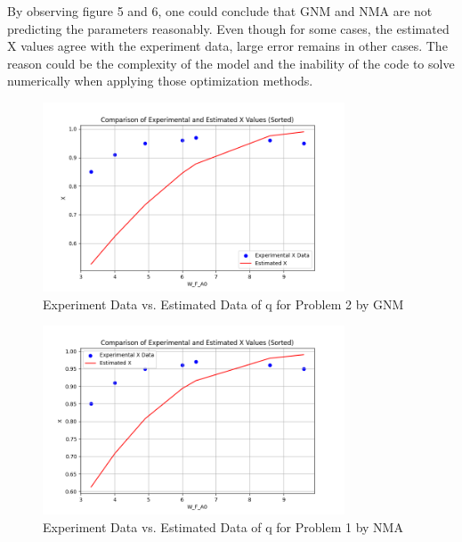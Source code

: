 \documentclass[12pt]{article} %
\begin{document}
By observing figure 5 and 6, one could conclude that GNM and NMA are not predicting the parameters reasonably. Even though for some cases, the estimated X values agree with the experiment data, large error remains in other cases.
The reason could be the complexity of the model and the inability of the code to solve numerically when applying those optimization methods.
\begin{figure}[ht]
    \centering
    \includegraphics[width=0.8\textwidth]{Q2_GMN_comp.png}
    \caption{Experiment Data vs. Estimated Data of q for Problem 2 by GNM}
\end{figure}
\begin{figure}[ht]
    \centering
    \includegraphics[width=0.8\textwidth]{Q2_NMA_comp.png}
    \caption{Experiment Data vs. Estimated Data of q for Problem 1 by NMA}
\end{figure}

\clearpage
\end{document}
